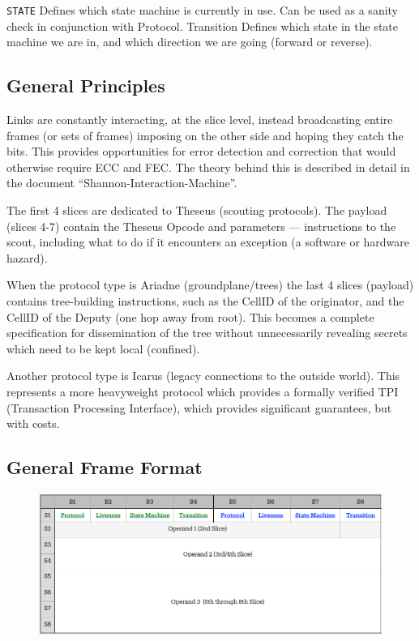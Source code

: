 \documentclass[../../../OAE-SPEC-MAIN.tex]{subfiles}
\begin{document}
\texttt{STATE} Defines which state machine is currently in use. Can be used as a sanity check in conjunction with Protocol.
Transition  Defines which state in the state machine we are in, and which direction we are going (forward or reverse).

\subsection{General Principles}

Links are constantly interacting, at the slice level, instead broadcasting entire frames (or sets of frames) imposing on the other side and hoping they catch the bits. This provides opportunities for error detection and correction that would otherwise require ECC and FEC. The theory behind this is described in detail in the document “Shannon-Interaction-Machine”. 

The first 4 slices are dedicated to Theseus (scouting protocols). The payload (slices 4-7) contain the Theseus Opcode and parameters — instructions to the scout, including what to do if it encounters an exception (a software or hardware hazard).

When the protocol type is Ariadne (groundplane/trees) the last 4 slices (payload) contains tree-building instructions, such as the CellID of the originator, and the CellID of the Deputy (one hop away from root). This becomes a complete specification for dissemination of the tree without unnecessarily revealing secrets which need to be kept local (confined).

Another protocol type is Icarus (legacy connections to the outside world). This represents a more heavyweight protocol which provides a formally verified TPI (Transaction Processing Interface), which provides significant guarantees, but with costs.

\subsection{General Frame Format}

   \begin{figure}
\includegraphics[width=1.5\linewidth]{./figures/General-Frame.pdf}
\end{figure}
\end{document}
